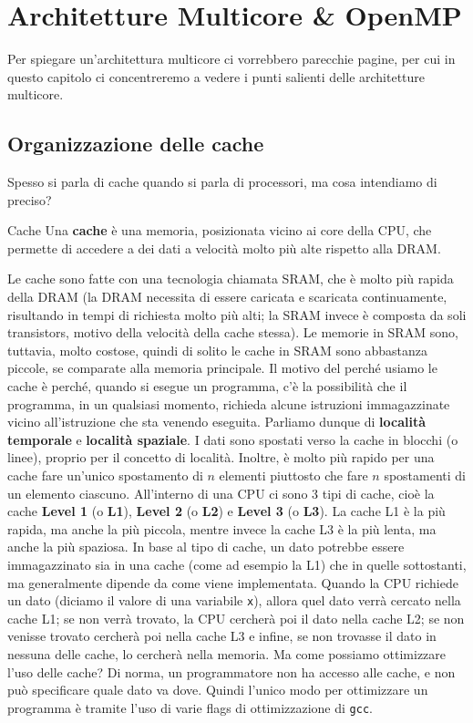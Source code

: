 \chapter{Architetture Multicore \texorpdfstring{\&}{&} OpenMP}

Per spiegare un'architettura multicore ci vorrebbero parecchie pagine, per cui in questo capitolo ci concentreremo a vedere i punti salienti delle architetture multicore.

\section{Organizzazione delle cache}

Spesso si parla di cache quando si parla di processori, ma cosa intendiamo di preciso?

\begin{definition}{Cache}
    Una \textbf{cache} è una memoria, posizionata vicino ai core della CPU, che permette di accedere a dei dati a velocità molto più alte rispetto alla DRAM.
\end{definition}

Le cache sono fatte con una tecnologia chiamata SRAM, che è molto più rapida della DRAM (la DRAM necessita di essere caricata e scaricata continuamente, risultando in tempi di richiesta molto più alti; la SRAM invece è composta da soli transistors, motivo della velocità della cache stessa). Le memorie in SRAM sono, tuttavia, molto costose, quindi di solito le cache in SRAM sono abbastanza piccole, se comparate alla memoria principale.
\nwl
Il motivo del perché usiamo le cache è perché, quando si esegue un programma, c'è la possibilità che il programma, in un qualsiasi momento, richieda alcune istruzioni immagazzinate vicino all'istruzione che sta venendo eseguita. Parliamo dunque di \textbf{località temporale} e \textbf{località spaziale}.
\nwl
I dati sono spostati verso la cache in blocchi (o linee), proprio per il concetto di località. Inoltre, è molto più rapido per una cache fare un'unico spostamento di $n$ elementi piuttosto che fare $n$ spostamenti di un elemento ciascuno.
\nwl
All'interno di una CPU ci sono 3 tipi di cache, cioè la cache \textbf{Level 1} (o \textbf{L1}), \textbf{Level 2} (o \textbf{L2}) e \textbf{Level 3} (o \textbf{L3}). La cache L1 è la più rapida, ma anche la più piccola, mentre invece la cache L3 è la più lenta, ma anche la più spaziosa. In base al tipo di cache, un dato potrebbe essere immagazzinato sia in una cache (come ad esempio la L1) che in quelle sottostanti, ma generalmente dipende da come viene implementata.
\nwl
Quando la CPU richiede un dato (diciamo il valore di una variabile \verb|x|), allora quel dato verrà cercato nella cache L1; se non verrà trovato, la CPU cercherà poi il dato nella cache L2; se non venisse trovato cercherà poi nella cache L3 e infine, se non trovasse il dato in nessuna delle cache, lo cercherà nella memoria.
\nwl
Ma come possiamo ottimizzare l'uso delle cache? Di norma, un programmatore non ha accesso alle cache, e non può specificare quale dato va dove. Quindi l'unico modo per ottimizzare un programma è tramite l'uso di varie flags di ottimizzazione di \verb|gcc|.

